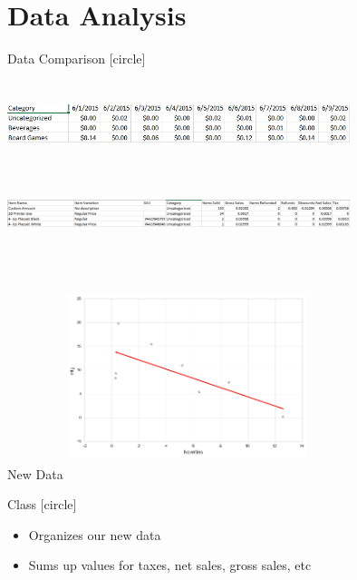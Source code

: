 \documentclass[compress,blue]{beamer}
\begin{document}
\section{Data Analysis}

\begin{frame}{Data Comparison}
[circle]
\begin{rows}
\row{\textwidth}
\includegraphics[width=10cm,height=2.5cm]{OriginalData}
\row{\textwidth}
\includegraphics[width=10cm,height=2.5cm]{NewData}
\end{rows}
\end{frame}

\begin{frame}{New Data}
\includegraphics[width=7cm,height=6cm]{mtg_novelties}
\end{frame}

\begin{frame}{Class}
[circle]
\begin{itemize}
	\item Organizes our new data
	\item Sums up values for taxes, net sales, gross sales, etc
\end{itemize}
\end{frame}
\end{document}
